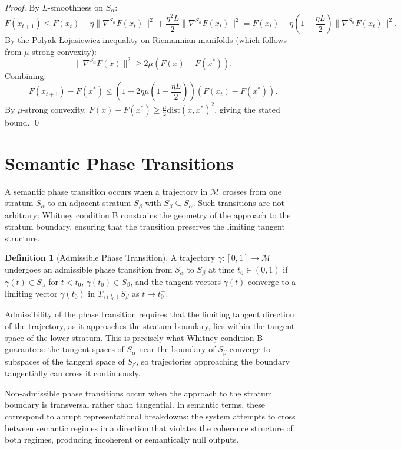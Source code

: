 \documentclass[12pt, a4paper, openany]{book}
\theoremstyle{plain}
\theoremstyle{definition}
\newtheorem{definition}[theorem]{Definition}
\theoremstyle{remark}
\begin{document}
\begin{proof}
By $L$-smoothness on $S_\alpha$:
\[
F(x_{t+1}) \leq F(x_t) - \eta \|\nabla^{S_\alpha} F(x_t)\|^2 + \frac{\eta^2 L}{2} \|\nabla^{S_\alpha} F(x_t)\|^2 = F(x_t) - \eta\!\left(1 - \frac{\eta L}{2}\right)\|\nabla^{S_\alpha} F(x_t)\|^2.
\]
By the Polyak-Łojasiewicz inequality on Riemannian manifolds (which follows from $\mu$-strong convexity):
\[
\|\nabla^{S_\alpha} F(x)\|^2 \geq 2\mu (F(x) - F(x^*)).
\]
Combining:
\[
F(x_{t+1}) - F(x^*) \leq \left(1 - 2\eta\mu\left(1 - \frac{\eta L}{2}\right)\right)(F(x_t) - F(x^*)).
\]
By $\mu$-strong convexity, $F(x) - F(x^*) \geq \frac{\mu}{2}\mathrm{dist}(x,x^*)^2$, giving the stated bound. \qed
\end{proof}

\section{Semantic Phase Transitions}

A semantic phase transition occurs when a trajectory in $\mathcal{M}$ crosses from one stratum $S_\alpha$ to an adjacent stratum $S_\beta$ with $S_\beta \subseteq \overline{S_\alpha}$. Such transitions are not arbitrary: Whitney condition B constrains the geometry of the approach to the stratum boundary, ensuring that the transition preserves the limiting tangent structure.

\begin{definition}[Admissible Phase Transition]
A trajectory $\gamma: [0,1] \to \mathcal{M}$ undergoes an admissible phase transition from $S_\alpha$ to $S_\beta$ at time $t_0 \in (0,1)$ if $\gamma(t) \in S_\alpha$ for $t < t_0$, $\gamma(t_0) \in S_\beta$, and the tangent vectors $\dot\gamma(t)$ converge to a limiting vector $\dot\gamma(t_0)$ in $T_{\gamma(t_0)} S_\beta$ as $t \to t_0^-$.
\end{definition}

Admissibility of the phase transition requires that the limiting tangent direction of the trajectory, as it approaches the stratum boundary, lies within the tangent space of the lower stratum. This is precisely what Whitney condition B guarantees: the tangent spaces of $S_\alpha$ near the boundary of $S_\beta$ converge to subspaces of the tangent space of $S_\beta$, so trajectories approaching the boundary tangentially can cross it continuously.

Non-admissible phase transitions occur when the approach to the stratum boundary is transversal rather than tangential. In semantic terms, these correspond to abrupt representational breakdowns: the system attempts to cross between semantic regimes in a direction that violates the coherence structure of both regimes, producing incoherent or semantically null outputs.
\end{document}
